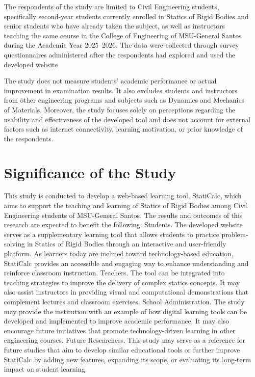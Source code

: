The respondents of the study are limited to Civil Engineering students, specifically second-year students currently enrolled in Statics of Rigid Bodies and senior students who have already taken the subject, as well as instructors teaching the same course in the College of Engineering of MSU-General Santos during the Academic Year 2025–2026. The data were collected through survey questionnaires administered after the respondents had explored and used the developed website

The study does not measure students’ academic performance or actual improvement in examination results. It also excludes students and instructors from other engineering programs and subjects such as Dynamics and Mechanics of Materials. Moreover, the study focuses solely on perceptions regarding the usability and effectiveness of the developed tool and does not account for external factors such as internet connectivity, learning motivation, or prior knowledge of the respondents.

\section{Significance of the Study}\label{sec:1-sots}

This study is conducted to develop a web-based learning tool, StatiCalc, which aims to support the teaching and learning of Statics of Rigid Bodies among Civil Engineering students of MSU-General Santos. The results and outcomes of this research are expected to benefit the following:
Students. The developed website serves as a supplementary learning tool that allows students to practice problem-solving in Statics of Rigid Bodies through an interactive and user-friendly platform. As learners today are inclined toward technology-based education, StatiCalc provides an accessible and engaging way to enhance understanding and reinforce classroom instruction.
Teachers. The tool can be integrated into teaching strategies to improve the delivery of complex statics concepts. It may also assist instructors in providing visual and computational demonstrations that complement lectures and classroom exercises.
School Administration. The study may provide the institution with an example of how digital learning tools can be developed and implemented to improve academic performance. It may also encourage future initiatives that promote technology-driven learning in other engineering courses.
Future Researchers. This study may serve as a reference for future studies that aim to develop similar educational tools or further improve StatiCalc by adding new features, expanding its scope, or evaluating its long-term impact on student learning.


